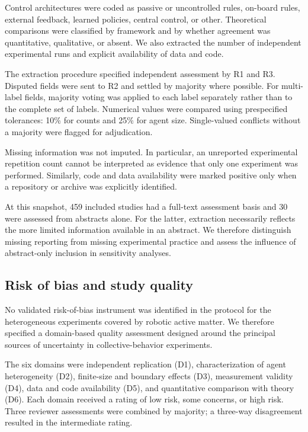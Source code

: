 Control architectures were coded as passive or
uncontrolled rules, on-board rules, external feedback,
learned policies, central control, or other.
Theoretical comparisons were classified by framework
and by whether agreement was quantitative,
qualitative, or absent. We also extracted the number
of independent experimental runs and explicit
availability of data and code.

The extraction procedure specified independent
assessment by R1 and R3. Disputed fields were sent
to R2 and settled by majority where possible.
For multi-label fields, majority voting was applied
to each label separately rather than to the complete
set of labels. Numerical values were compared using
prespecified tolerances: 10\% for counts and 25\%
for agent size. Single-valued conflicts without a
majority were flagged for adjudication.

Missing information was not imputed. In particular,
an unreported experimental repetition count cannot
be interpreted as evidence that only one experiment
was performed. Similarly, code and data availability
were marked positive only when a repository or
archive was explicitly identified.

At this snapshot, 459 included studies had a
full-text assessment basis and 30 were assessed
from abstracts alone. For the latter, extraction
necessarily reflects the more limited information
available in an abstract. We therefore distinguish
missing reporting from missing experimental practice
and assess the influence of abstract-only inclusion
in sensitivity analyses.

\subsection{Risk of bias and study quality}
\label{sec:methods-bias}

No validated risk-of-bias instrument was identified
in the protocol for the heterogeneous experiments
covered by robotic active matter. We therefore
specified a domain-based quality assessment designed
around the principal sources of uncertainty in
collective-behavior experiments.

The six domains were independent replication (D1),
characterization of agent heterogeneity (D2),
finite-size and boundary effects (D3),
measurement validity (D4), data and code
availability (D5), and quantitative comparison
with theory (D6). Each domain received a rating
of low risk, some concerns, or high risk.
Three reviewer assessments were combined by
majority; a three-way disagreement resulted in
the intermediate rating.


